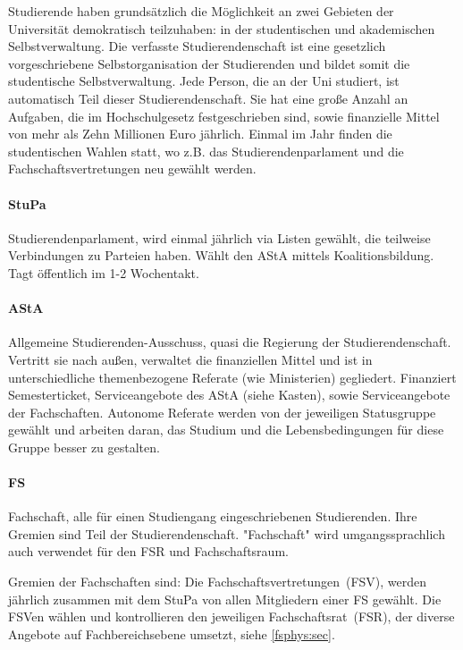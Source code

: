 \begin{multicols*}{2}
Studierende haben grundsätzlich die Möglichkeit an zwei Gebieten der Universität demokratisch teilzuhaben: in der studentischen und akademischen Selbstverwaltung.
Die verfasste Studierendenschaft ist eine gesetzlich vorgeschriebene Selbstorganisation der Studierenden und bildet somit die studentische Selbstverwaltung. Jede Person, die an der Uni studiert, ist automatisch Teil dieser Studierendenschaft. Sie hat eine große Anzahl an Aufgaben, die im Hochschulgesetz festgeschrieben sind, sowie finanzielle Mittel von mehr als Zehn Millionen Euro jährlich. 
Einmal im Jahr finden die studentischen Wahlen statt, wo z.B. das Studierendenparlament und die Fachschaftsvertretungen neu gewählt werden. 

\paragraph{StuPa}
Studierendenparlament, wird einmal jährlich via Listen gewählt, die teilweise Verbindungen zu Parteien haben. Wählt den AStA mittels Koalitionsbildung. Tagt öffentlich im 1-2 Wochentakt. 


\paragraph{AStA}
Allgemeine Studierenden-Ausschuss, quasi die Regierung der Studierendenschaft. Vertritt sie nach außen, verwaltet die finanziellen Mittel und ist in unterschiedliche themenbezogene Referate (wie Ministerien) gegliedert. Finanziert Semesterticket, Serviceangebote des AStA (siehe Kasten), sowie Serviceangebote der Fachschaften. Autonome Referate werden von der jeweiligen Statusgruppe gewählt und arbeiten daran, das Studium und die Lebensbedingungen für diese Gruppe besser zu gestalten.


\paragraph{FS}
Fachschaft, alle für einen Studiengang eingeschriebenen Studierenden. Ihre Gremien sind Teil der Studierendenschaft. "Fachschaft" wird umgangssprachlich auch verwendet für den FSR und Fachschaftsraum.

Gremien der Fachschaften sind: Die Fachschaftsvertretungen~(FSV), werden jährlich zusammen mit dem StuPa von allen Mitgliedern einer FS gewählt. Die FSVen wählen und kontrollieren den jeweiligen Fachschaftsrat~(FSR), der diverse Angebote auf Fachbereichsebene umsetzt, siehe \cref{fsphys:sec}.


\end{multicols*}

